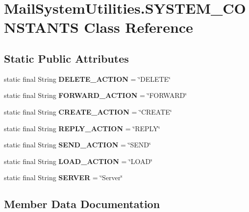 \section{Mail\+System\+Utilities.\+S\+Y\+S\+T\+E\+M\+\_\+\+C\+O\+N\+S\+T\+A\+N\+TS Class Reference}
\label{class_mail_system_utilities_1_1_s_y_s_t_e_m___c_o_n_s_t_a_n_t_s}
\subsection*{Static Public Attributes}
\begin{DoxyCompactItemize}
\item 
static final String \textbf{ D\+E\+L\+E\+T\+E\+\_\+\+A\+C\+T\+I\+ON} = \char`\"{}D\+E\+L\+E\+TE\char`\"{}
\item 
static final String \textbf{ F\+O\+R\+W\+A\+R\+D\+\_\+\+A\+C\+T\+I\+ON} = \char`\"{}F\+O\+R\+W\+A\+RD\char`\"{}
\item 
static final String \textbf{ C\+R\+E\+A\+T\+E\+\_\+\+A\+C\+T\+I\+ON} = \char`\"{}C\+R\+E\+A\+TE\char`\"{}
\item 
static final String \textbf{ R\+E\+P\+L\+Y\+\_\+\+A\+C\+T\+I\+ON} = \char`\"{}R\+E\+P\+LY\char`\"{}
\item 
static final String \textbf{ S\+E\+N\+D\+\_\+\+A\+C\+T\+I\+ON} = \char`\"{}S\+E\+ND\char`\"{}
\item 
static final String \textbf{ L\+O\+A\+D\+\_\+\+A\+C\+T\+I\+ON} = \char`\"{}L\+O\+AD\char`\"{}
\item 
static final String \textbf{ S\+E\+R\+V\+ER} = \char`\"{}Server\char`\"{}
\end{DoxyCompactItemize}


\subsection{Member Data Documentation}
\mbox{\label{class_mail_system_utilities_1_1_s_y_s_t_e_m___c_o_n_s_t_a_n_t_s_a72de23b61589166e9133d211e651ac20}} 
